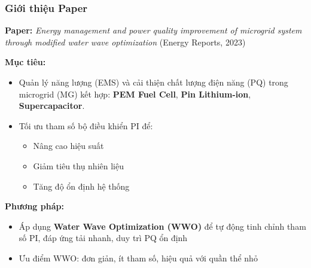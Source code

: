\begin{frame}
    \frametitle{Giới thiệu Paper}

    \textbf{Paper:} \textit{Energy management and power quality improvement of microgrid system through modified water wave optimization} (Energy Reports, 2023) \cite{choudhury2023energy}

    \vspace{0.5em}
    \textbf{Mục tiêu:}
    \begin{itemize}
        \item Quản lý năng lượng (EMS) và cải thiện chất lượng điện năng (PQ) trong microgrid (MG) kết hợp: \textbf{PEM Fuel Cell}, \textbf{Pin Lithium-ion}, \textbf{Supercapacitor}.
        \item Tối ưu tham số bộ điều khiển PI để:
        \begin{itemize}
            \item Nâng cao hiệu suất
            \item Giảm tiêu thụ nhiên liệu
            \item Tăng độ ổn định hệ thống
        \end{itemize}
    \end{itemize}

    \vspace{0.5em}
    \textbf{Phương pháp:}
    \begin{itemize}
        \item Áp dụng \textbf{Water Wave Optimization (WWO)} để tự động tinh chỉnh tham số PI, đáp ứng tải nhanh, duy trì PQ ổn định
        \item Ưu điểm WWO: đơn giản, ít tham số, hiệu quả với quần thể nhỏ
    \end{itemize}
\end{frame}

